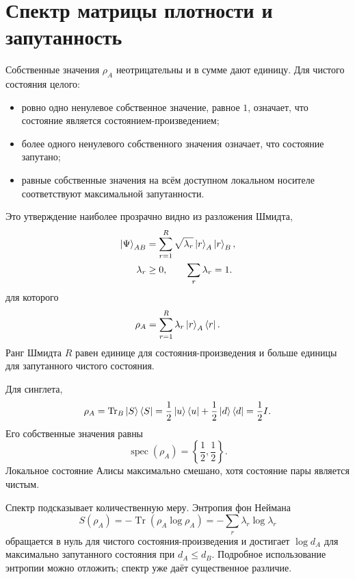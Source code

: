 \section{Спектр матрицы плотности и запутанность}

Собственные значения \(\rho_A\) неотрицательны и в сумме дают единицу. Для чистого состояния целого:
\begin{itemize}
\item ровно одно ненулевое собственное значение, равное \(1\), означает, что состояние является состоянием-произведением;
\item более одного ненулевого собственного значения означает, что состояние запутано;
\item равные собственные значения на всём доступном локальном носителе соответствуют максимальной запутанности.
\end{itemize}
Это утверждение наиболее прозрачно видно из разложения Шмидта,
\begin{equation}
\begin{aligned}
\left\lvert\Psi\right\rangle_{AB}
&=\sum_{r=1}^{R}\sqrt{\lambda_r}
\left\lvert r\right\rangle_A\left\lvert r\right\rangle_B,\\
\lambda_r&\geq0,
\qquad
\sum_r\lambda_r=1.
\end{aligned}
\label{eq:l7-schmidt}
\end{equation}
для которого
\begin{equation}
\rho_A=\sum_{r=1}^{R}\lambda_r\left\lvert r\right\rangle_A\left\langle r\right\rvert.
\label{eq:l7-schmidt-density}
\end{equation}
Ранг Шмидта \(R\) равен единице для состояния-произведения и больше единицы для запутанного чистого состояния.

Для синглета,
\begin{equation}
\rho_A
=\operatorname{Tr}_B\left\lvert S\right\rangle\left\langle S\right\rvert
=\frac12\left\lvert u\right\rangle\left\langle u\right\rvert
+\frac12\left\lvert d\right\rangle\left\langle d\right\rvert
=\frac12 I.
\label{eq:l7-singlet-reduced-density}
\end{equation}
Его собственные значения равны
\begin{equation}
\operatorname{spec}(\rho_A)
=\left\{\frac12,\frac12\right\}.
\end{equation}
Локальное состояние Алисы максимально смешано, хотя состояние пары является чистым.

Спектр подсказывает количественную меру. Энтропия фон Неймана
\begin{equation}
S(\rho_A)
=-\operatorname{Tr}(\rho_A\log\rho_A)
=-\sum_r\lambda_r\log\lambda_r
\label{eq:l7-entanglement-entropy}
\end{equation}
обращается в нуль для чистого состояния-произведения и достигает \(\log d_A\) для максимально запутанного состояния при \(d_A\leq d_B\). Подробное использование энтропии можно отложить; спектр уже даёт существенное различие.

